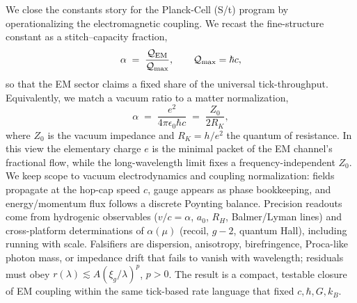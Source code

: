 We close the constants story for the Planck-Cell (S/t) program by
operationalizing the electromagnetic coupling. We recast the fine-structure
constant as a stitch–capacity fraction,
\[
\alpha \;=\; \frac{\mathcal Q_{\rm EM}}{\mathcal Q_{\max}},\qquad \mathcal Q_{\max}=\hbar c,
\]
so that the EM sector claims a fixed share of the universal tick-throughput.
Equivalently, we match a vacuum ratio to a matter normalization,
\[
\alpha \;=\; \frac{e^2}{4\pi\epsilon_0\hbar c} \;=\; \frac{Z_0}{2R_K},
\]
where \(Z_0\) is the vacuum impedance and \(R_K=h/e^2\) the quantum of
resistance. In this view the elementary charge \(e\) is the minimal packet of
the EM channel’s fractional flow, while the long-wavelength limit fixes a
frequency-independent \(Z_0\). We keep scope to vacuum electrodynamics and
coupling normalization: fields propagate at the hop-cap speed \(c\), gauge
appears as phase bookkeeping, and energy/momentum flux follows a discrete
Poynting balance. Precision readouts come from hydrogenic observables
(\(v/c=\alpha\), \(a_0\), \(R_H\), Balmer/Lyman lines) and cross-platform
determinations of \(\alpha(\mu)\) (recoil, \(g\!-\!2\), quantum Hall), including
running with scale. Falsifiers are dispersion, anisotropy, birefringence,
Proca-like photon mass, or impedance drift that fails to vanish with
wavelength; residuals must obey \(r(\lambda)\!\lesssim\!A(\xi_g/\lambda)^p\),
\(p>0\). The result is a compact, testable closure of EM coupling within the
same tick-based rate language that fixed \(c,\hbar,G,k_B\).
